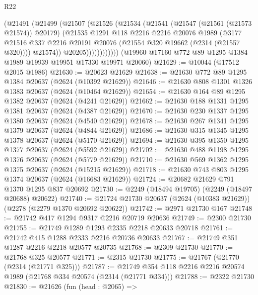 \begin{lexlean}{R22}
\begin{coremodule}
                  (@21491
                    (@21499
                      (@21507
                        (@21526
                          (@21534
                            (@21541
                              (@21547 (@21561 (@21573 @21574)) @20179)
                              (@21535
                                @1291
                                @118
                                @2216
                                @2216
                                @20076
                                @1989
                                (@3177
                                  @21516
                                  @337
                                  @2216
                                  @20191
                                  @20076
                                  (@21554 @320 @19662 (@2314 (@21557 @320))))
                                @21574))
                            @20205))))))))))))
    (@19960 @17160 @772 @89 @1295 @1384 @1989 @19939 @19951 @17330 @19971 @20060)
@21629 := @10044 (@17512 @2015 @1986)
@21630 := @20623 @21629
@21638 := @21630 @772 @89 @1295 @1384 @20637 (@2624 (@10392 @21629))
@21646 := @21630 @808 @1301 @1326 @1383 @20637 (@2624 (@10464 @21629))
@21654 := @21630 @164 @89 @1295 @1382 @20637 (@2624 (@4241 @21629))
@21662 := @21630 @188 @1331 @1295 @1381 @20637 (@2624 (@4387 @21629))
@21670 := @21630 @230 @1337 @1295 @1380 @20637 (@2624 (@4540 @21629))
@21678 := @21630 @267 @1341 @1295 @1379 @20637 (@2624 (@4844 @21629))
@21686 := @21630 @315 @1345 @1295 @1378 @20637 (@2624 (@5170 @21629))
@21694 := @21630 @395 @1350 @1295 @1377 @20637 (@2624 (@5592 @21629))
@21702 := @21630 @488 @1198 @1295 @1376 @20637 (@2624 (@5779 @21629))
@21710 := @21630 @569 @1362 @1295 @1375 @20637 (@2624 (@15215 @21629))
@21718 := @21630 @743 @803 @1295 @1374 @20637 (@2624 (@16683 @21629))
@21724 := @20682 @21629 @791 @1370 @1295 @837 @20692
@21730 := @2249 (@18494 @19705) (@2249 (@18497 @20688) @20622)
@21740 := @21724 @21730 @20637 (@2624 (@10383 @21629)) (@2278 (@2279 @1370 @20692 @20622))
@21742 := @2971 @21730 @167
@21748 := @21742 @417 @1294 @9317 @2216 @20719 @20636
@21749 := @2300 @21730
@21755 := @21749 @1289 @1293 @2335 @2218 @20633 @20718
@21761 := @21742 @415 @1288 @2333 @2216 @20736 @20633
@21767 := @21749 @351 @1287 @2216 @2218 @20577 @20735
@21768 := @2309 @21730
@21770 := @21768 @325 @20577
@21771 := @2315 @21730
@21775 := @21767 (@21770 (@2314 (@21771 @325)))
@21787 := @21749 @354 @118 @2216 @2216 @20574 @1989 (@21768 @334 @20574 (@2314 (@21771 @334)))
@21788 := @2322 @21730
@21830 := @21626
    (fun (head : @2065) =>

\end{coremodule}
\end{lexlean}
